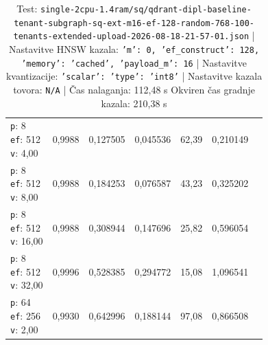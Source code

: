 \begin{table}[htbp]
\begin{tabularx}{\textwidth}{Xrrrrrr}
    \makecell{\texttt{p}: 8\\\texttt{ef}: 512\\\texttt{v}: 4,00} & 0,9988 & 0,127505 & 0,045536 & 62,39 & 0,210149 \\
    \makecell{\texttt{p}: 8\\\texttt{ef}: 512\\\texttt{v}: 8,00} & 0,9988 & 0,184253 & 0,076587 & 43,23 & 0,325202 \\
    \makecell{\texttt{p}: 8\\\texttt{ef}: 512\\\texttt{v}: 16,00} & 0,9988 & 0,308944 & 0,147696 & 25,82 & 0,596054 \\
    \makecell{\texttt{p}: 8\\\texttt{ef}: 512\\\texttt{v}: 32,00} & 0,9996 & 0,528385 & 0,294772 & 15,08 & 1,096541 \\
    \makecell{\texttt{p}: 64\\\texttt{ef}: 256\\\texttt{v}: 2,00} & 0,9930 & 0,642996 & 0,188144 & 97,08 & 0,866508 \\
    \bottomrule
  \end{tabularx}
\caption* {Test: \texttt{single-2cpu-1.4ram/sq/qdrant-dipl-baseline-tenant-subgraph-sq-ext-m16-ef-128-random-768-100-tenants-extended-upload-2026-08-18-21-57-01.json} | Nastavitve HNSW kazala: \texttt{{'m': 0, 'ef\_construct': 128, 'memory': 'cached', 'payload\_m': 16}} | Nastavitve kvantizacije: \texttt{{'scalar': {'type': 'int8'}}} | Nastavitve kazala tovora: \texttt{N/A} | Čas nalaganja: 112,48 s Okviren čas gradnje kazala: 210,38 s}\end{table}


